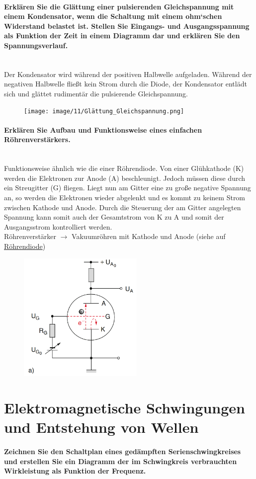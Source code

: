 \documentclass[a4paper, 11pt, ngerman, parskip=half-]{scrartcl}
\newcommand{\myparagraph}[1]{\paragraph{#1}\mbox{}\\}
\begin{document}
\myparagraph{Erklären Sie die Glättung einer pulsierenden Gleichspannung mit einem Kondensator, wenn
    die Schaltung mit einem ohm‘schen Widerstand belastet ist. Stellen Sie Eingangs- und
    Ausgangsspannung als Funktion der Zeit in einem Diagramm dar und erklären Sie den Spannungsverlauf.}
Der Kondensator wird während der positiven Halbwelle aufgeladen. Während der negativen Halbwelle fließt kein Strom durch die Diode,
der Kondensator entlädt sich und \glqq glättet \grqq rudimentär die pulsierende Gleichspannung.
\begin{figure}[H]
    \centering
    \texttt{[image: image/11/Glättung\_Gleichspannung.png]}
\end{figure}
\myparagraph{Erklären Sie Aufbau und Funktionsweise eines einfachen Röhrenverstärkers.}
Funktionsweise ähnlich wie die einer Röhrendiode. Von einer Glühkathode (K) werden die Elektronen zur Anode (A) beschleunigt. Jedoch müssen diese durch ein Streugitter (G) fliegen.
Liegt nun am Gitter eine zu große negative Spannung an, so werden die Elektronen wieder abgelenkt und es kommt zu keinem Strom zwischen Kathode und Anode. Durch die Steuerung
der am Gitter angelegten Spannung kann somit auch der Gesamtstrom von K zu A und somit der Ausgangsstrom kontrolliert werden. \\
Röhrenverstärker $\rightarrow$ Vakuumröhren mit Kathode und Anode  (siehe auf \hyperlink{diode_link}{Röhrendiode})
\begin{figure}[H]
    \centering
    \includegraphics[width=6cm]{image/11/Röhrenverstärker.png}
\end{figure}
\newpage

\section{Elektromagnetische Schwingungen und Entstehung von Wellen}

\paragraph{Zeichnen Sie den Schaltplan eines gedämpften Serienschwingkreises und erstellen Sie ein
    Diagramm der im Schwingkreis verbrauchten Wirkleistung als Funktion der Frequenz.} ~
\end{document}
